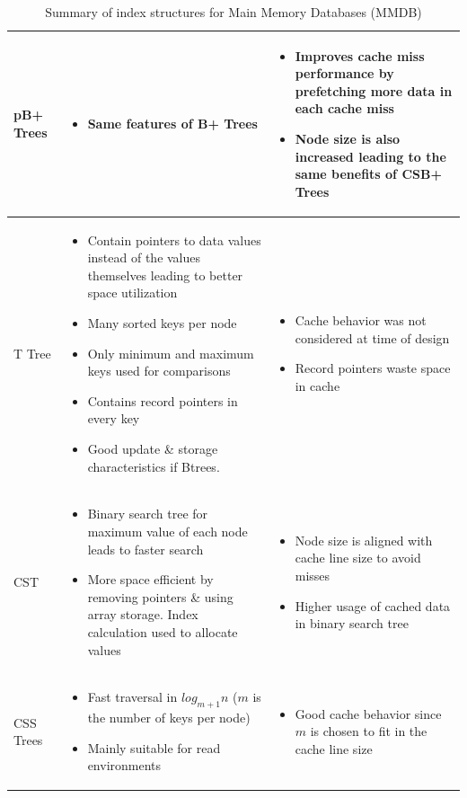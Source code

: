 \documentclass[12pt,a4paper]{article}
\begin{document}
\begin{table}[t!]
{\begin{tabular}{p{2cm}|p{6cm}|p{6cm}}
pB+ Trees & \begin{itemize}
              \item Same features of B+ Trees
             \end{itemize} &
\begin{itemize}
 \item Improves cache miss performance by prefetching more data in each cache miss
\item Node size is also increased leading to the same benefits of CSB+ Trees
\end{itemize}\\
\hline
T Tree &  \begin{itemize}
              \item Contain pointers to data values instead of the values themselves leading to better space utilization
\item Many sorted keys per node
\item Only minimum and maximum keys used for comparisons
\item Contains record pointers in every key
\item Good update \& storage characteristics if Btrees.

             \end{itemize} &
\begin{itemize}
 \item Cache behavior was not considered at time of design
\item Record pointers waste space in cache
\end{itemize}\\
\hline
CST & \begin{itemize}
       \item Binary search tree for maximum value of each node leads to faster search
\item More space efficient by removing pointers \& using array storage. Index calculation used to allocate values
      \end{itemize} &
\begin{itemize}
 \item Node size is aligned with cache line size to avoid misses
\item Higher usage of cached data in binary search tree
\end{itemize}\\
\hline
CSS Trees &  \begin{itemize}
       \item Fast traversal in $log_{m+1}n$ ($m$ is the number of keys per node)
\item Mainly suitable for read environments
      \end{itemize} &
\begin{itemize}
 \item Good cache behavior since $m$ is chosen to fit in the cache line size
\end{itemize}\\

\end{tabular}
}
\caption{Summary of index structures for Main Memory Databases (MMDB)}
\label{tab:mmdbindexsumm}
\end{table}
\end{document}
